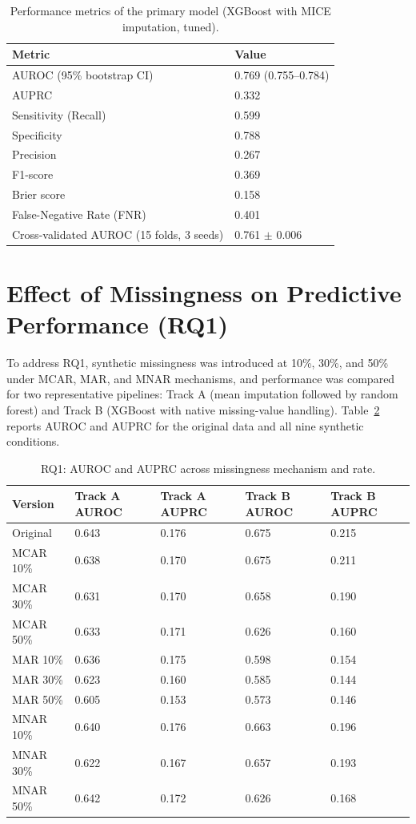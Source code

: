 \documentclass[12pt,a4paper]{report}
\begin{document}
\begin{table}[H]
\centering
\caption{Performance metrics of the primary model (XGBoost with MICE imputation, tuned).}
\label{tab:best-model-metrics}
\begin{tabular}{ll}
\toprule
Metric & Value \\
\midrule
AUROC (95\% bootstrap CI) & 0.769 (0.755--0.784) \\
AUPRC & 0.332 \\
Sensitivity (Recall) & 0.599 \\
Specificity & 0.788 \\
Precision & 0.267 \\
F1-score & 0.369 \\
Brier score & 0.158 \\
False-Negative Rate (FNR) & 0.401 \\
Cross-validated AUROC (15 folds, 3 seeds) & 0.761 $\pm$ 0.006 \\
\bottomrule
\end{tabular}
\end{table}


\section{Effect of Missingness on Predictive Performance (RQ1)}
To address RQ1, synthetic missingness was introduced at 10\%, 30\%, and 50\% under MCAR, MAR, and MNAR mechanisms, and performance was compared for two representative pipelines: Track A (mean imputation followed by random forest) and Track B (XGBoost with native missing-value handling). Table~\ref{tab:rq1-missingness} reports AUROC and AUPRC for the original data and all nine synthetic conditions.


\begin{table}[H]
\centering
\caption{RQ1: AUROC and AUPRC across missingness mechanism and rate.}
\label{tab:rq1-missingness}
\small
\begin{tabular}{lllll}
\toprule
Version & Track A AUROC & Track A AUPRC & Track B AUROC & Track B AUPRC \\
\midrule
Original & 0.643 & 0.176 & 0.675 & 0.215 \\
MCAR 10\% & 0.638 & 0.170 & 0.675 & 0.211 \\
MCAR 30\% & 0.631 & 0.170 & 0.658 & 0.190 \\
MCAR 50\% & 0.633 & 0.171 & 0.626 & 0.160 \\
MAR 10\% & 0.636 & 0.175 & 0.598 & 0.154 \\
MAR 30\% & 0.623 & 0.160 & 0.585 & 0.144 \\
MAR 50\% & 0.605 & 0.153 & 0.573 & 0.146 \\
MNAR 10\% & 0.640 & 0.176 & 0.663 & 0.196 \\
MNAR 30\% & 0.622 & 0.167 & 0.657 & 0.193 \\
MNAR 50\% & 0.642 & 0.172 & 0.626 & 0.168 \\
\bottomrule
\end{tabular}
\end{table}
\end{document}
